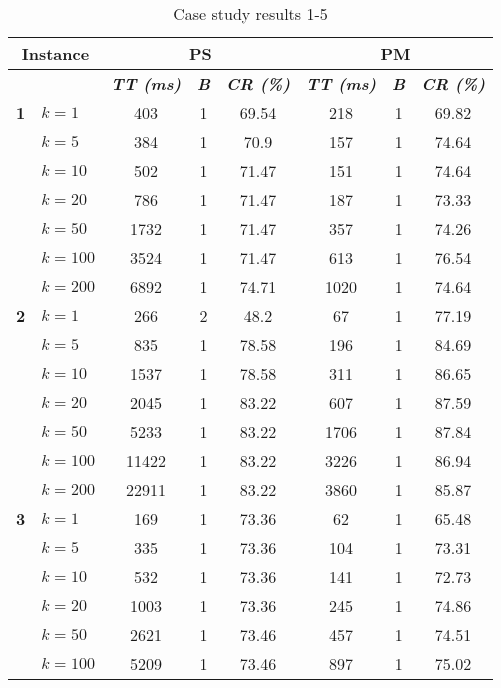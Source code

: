     \begin{table}[htbp]
    \caption{Case study results 1-5}
    \centering
    \begin{tabular}{|l|l|c|c|c|c|c|c|}
    \hline
    \multicolumn{ 2}{|c|}{\textbf{Instance}} & \multicolumn{ 3}{c|}{\textbf{PS}} & \multicolumn{ 3}{c|}{\textbf{PM}} \\ \hline
    \multicolumn{ 2}{|l|}{} & \textbf{\textit{TT (ms)}} & \textbf{\textit{B}} & \textbf{\textit{CR (\%)}} & \textbf{\textit{TT (ms)}} & \textbf{\textit{B}} & \textbf{\textit{CR (\%)}} \\ \hline
    \multicolumn{1}{|r|}{\textbf{1}} & $k=1$ & 403 & 1 & 69.54 & 218 & 1 & 69.82 \\ 
     & $k=5$ & 384 & 1 & 70.9 & 157 & 1 & 74.64 \\ 
     & $k=10$ & 502 & 1 & 71.47 & 151 & 1 & 74.64 \\ 
     & $k=20$ & 786 & 1 & 71.47 & 187 & 1 & 73.33 \\ 
     & $k=50$ & 1732 & 1 & 71.47 & 357 & 1 & 74.26 \\ 
     & $k=100$ & 3524 & 1 & 71.47 & 613 & 1 & 76.54 \\ 
     & $k=200$ & 6892 & 1 & 74.71 & 1020 & 1 & 74.64 \\ \hline
    \multicolumn{1}{|r|}{\textbf{2}} & $k=1$ & 266 & 2 & 48.2 & 67 & 1 & 77.19 \\ 
     & $k=5$ & 835 & 1 & 78.58 & 196 & 1 & 84.69 \\ 
     & $k=10$ & 1537 & 1 & 78.58 & 311 & 1 & 86.65 \\ 
     & $k=20$ & 2045 & 1 & 83.22 & 607 & 1 & 87.59 \\ 
     & $k=50$ & 5233 & 1 & 83.22 & 1706 & 1 & 87.84 \\ 
     & $k=100$ & 11422 & 1 & 83.22 & 3226 & 1 & 86.94 \\ 
     & $k=200$ & 22911 & 1 & 83.22 & 3860 & 1 & 85.87 \\ \hline
    \multicolumn{1}{|r|}{\textbf{3}} & $k=1$ & 169 & 1 & 73.36 & 62 & 1 & 65.48 \\ 
     & $k=5$ & 335 & 1 & 73.36 & 104 & 1 & 73.31 \\ 
     & $k=10$ & 532 & 1 & 73.36 & 141 & 1 & 72.73 \\ 
     & $k=20$ & 1003 & 1 & 73.36 & 245 & 1 & 74.86 \\ 
     & $k=50$ & 2621 & 1 & 73.46 & 457 & 1 & 74.51 \\ 
     & $k=100$ & 5209 & 1 & 73.46 & 897 & 1 & 75.02 \\ 

\end{tabular}
\end{table}
